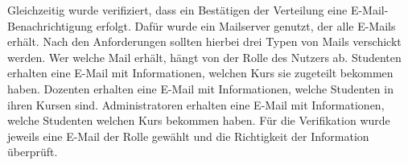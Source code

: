 			Gleichzeitig wurde verifiziert, dass ein Bestätigen der Verteilung eine E-Mail-Benachrichtigung erfolgt.
			Dafür wurde ein Mailserver genutzt, der alle E-Mails erhält.
			Nach den Anforderungen sollten hierbei drei Typen von Mails verschickt werden.
			Wer welche Mail erhält, hängt von der Rolle des Nutzers ab.
			Studenten erhalten eine E-Mail mit Informationen, welchen Kurs sie zugeteilt bekommen haben.
			Dozenten erhalten eine E-Mail mit Informationen, welche Studenten in ihren Kursen sind.
			Administratoren erhalten eine E-Mail mit Informationen, welche Studenten welchen Kurs bekommen haben.\newline
			Für die Verifikation wurde jeweils eine E-Mail der Rolle gewählt und die Richtigkeit der Information überprüft.\newline
			
			
		
		
		
		
		
		
		
		
		
		
		
		
		
		
		
		
		
		
		
		
		
		
		
		
		
